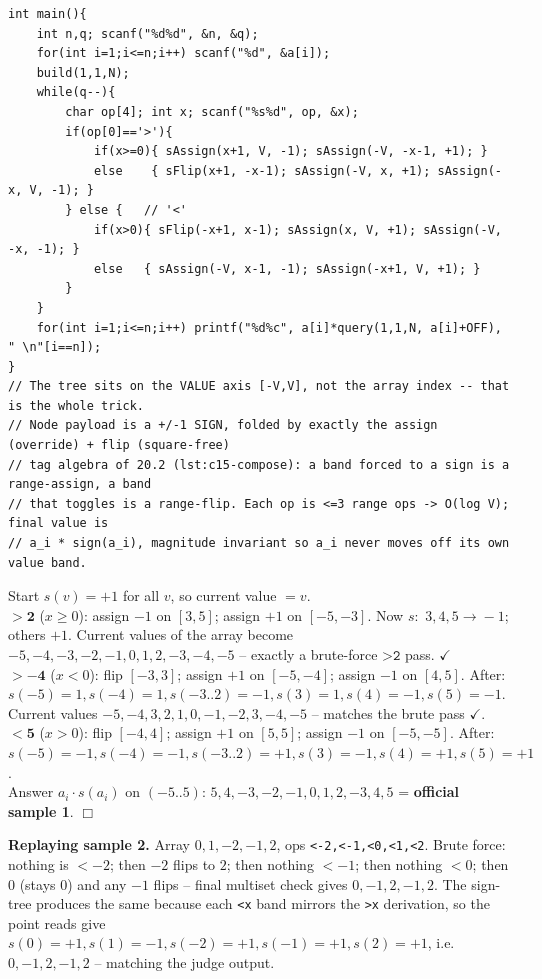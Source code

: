 \begin{lstlisting}[caption={CF 1146E Summit: a segment tree over the VALUE axis holding a +/-1 sign with the assign+flip tag of lst:c15-compose; the answer is the initial value times its sign}, label={lst:c15-summit}]
int main(){
    int n,q; scanf("%d%d", &n, &q);
    for(int i=1;i<=n;i++) scanf("%d", &a[i]);
    build(1,1,N);
    while(q--){
        char op[4]; int x; scanf("%s%d", op, &x);
        if(op[0]=='>'){
            if(x>=0){ sAssign(x+1, V, -1); sAssign(-V, -x-1, +1); }
            else    { sFlip(x+1, -x-1); sAssign(-V, x, +1); sAssign(-x, V, -1); }
        } else {   // '<'
            if(x>0){ sFlip(-x+1, x-1); sAssign(x, V, +1); sAssign(-V, -x, -1); }
            else   { sAssign(-V, x-1, -1); sAssign(-x+1, V, +1); }
        }
    }
    for(int i=1;i<=n;i++) printf("%d%c", a[i]*query(1,1,N, a[i]+OFF), " \n"[i==n]);
}
// The tree sits on the VALUE axis [-V,V], not the array index -- that is the whole trick.
// Node payload is a +/-1 SIGN, folded by exactly the assign (override) + flip (square-free)
// tag algebra of 20.2 (lst:c15-compose): a band forced to a sign is a range-assign, a band
// that toggles is a range-flip. Each op is <=3 range ops -> O(log V); final value is
// a_i * sign(a_i), magnitude invariant so a_i never moves off its own value band.
\end{lstlisting}

\begin{tracebox}
Start \(s(v)=+1\) for all \(v\), so current value \(=v\).\\
\(\mathbf{>2}\) (\(x\ge0\)): assign \(-1\) on \([3,5]\); assign \(+1\) on \([-5,-3]\). Now
\(s:\) \(3,4,5\!\to\!-1\); others \(+1\). Current values of the array become
\(-5,-4,-3,-2,-1,0,1,2,-3,-4,-5\) -- exactly a brute-force \(\texttt{>2}\) pass. \(\checkmark\)\\
\(\mathbf{>-4}\) (\(x<0\)): flip \([-3,3]\); assign \(+1\) on \([-5,-4]\); assign \(-1\) on
\([4,5]\). After: \(s(-5){=}1,s(-4){=}1,s(-3{..}2){=}-1,s(3){=}1,s(4){=}-1,s(5){=}-1\).
Current values \(-5,-4,3,2,1,0,-1,-2,3,-4,-5\) -- matches the brute pass \(\checkmark\).\\
\(\mathbf{<5}\) (\(x>0\)): flip \([-4,4]\); assign \(+1\) on \([5,5]\); assign \(-1\) on
\([-5,-5]\). After: \(s(-5){=}-1,s(-4){=}-1,s(-3..2){=}+1,s(3){=}-1,s(4){=}+1,s(5){=}+1\).\\
Answer \(a_i\cdot s(a_i)\) on \((-5..5)\): \(5,4,-3,-2,-1,0,1,2,-3,4,5\) = \textbf{official
sample 1}. \(\Box\)
\end{tracebox}

\noindent\textbf{Replaying sample 2.} Array \(0,1,-2,-1,2\), ops
\texttt{<-2,<-1,<0,<1,<2}. Brute force: nothing is \(<-2\); then \(-2\) flips to \(2\);
then nothing \(<-1\); then nothing \(<0\); then \(0\) (stays \(0\)) and any \(-1\) flips --
final multiset check gives \(0,-1,2,-1,2\). The sign-tree produces the same because each
\texttt{<x} band mirrors the \texttt{>x} derivation, so the point reads give
\(s(0){=}+1,s(1){=}-1,s(-2){=}+1,s(-1){=}+1,s(2){=}+1\), i.e. \(0,-1,2,-1,2\) -- matching
the judge output.

